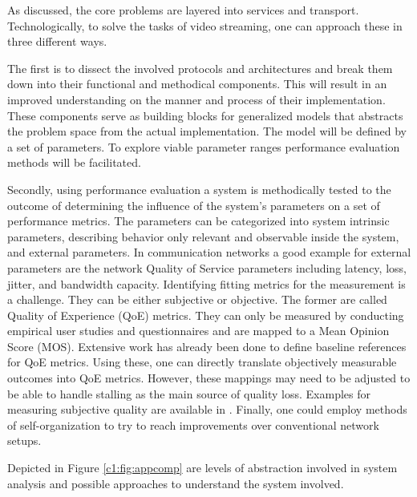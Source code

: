 


As discussed, the core problems are layered into services and transport. Technologically, to solve the tasks of video streaming, one can approach these  in three different ways.

The first is to dissect the involved protocols and architectures and break them down into their functional and methodical components. This will result in an improved understanding on the manner and process of their implementation. These components serve as building blocks for generalized models that abstracts the problem space from the actual implementation. The model will be defined by a set of parameters. To explore viable parameter ranges performance evaluation methods will be facilitated.


Secondly, using performance evaluation a system is methodically tested to the outcome of determining the influence of the system's parameters on a set of performance metrics. The parameters can be categorized into system intrinsic parameters, describing behavior only relevant and observable inside the system, and external parameters. In communication networks a good example for external parameters are the network Quality of Service parameters including latency, loss, jitter, and bandwidth capacity. Identifying fitting metrics for the measurement is a challenge. They can be either subjective or objective. The former are called Quality of Experience (QoE) metrics. They can only be measured by conducting empirical user studies and questionnaires and are mapped to a Mean Opinion Score (MOS). Extensive work has already been done to define baseline references for QoE metrics. Using these, one can directly translate objectively measurable outcomes into QoE metrics. However, these mappings may need to be adjusted to be able to handle stalling as the main source of quality loss. Examples for measuring subjective quality are available in \cite{gustafsson2008measuring, ketyo2010qoe}. 
Finally, one could employ methods of self-organization to try to reach improvements over conventional network setups.





Depicted in Figure \ref{c1:fig:appcomp} are levels of abstraction involved in system analysis and possible approaches to understand the system involved.


